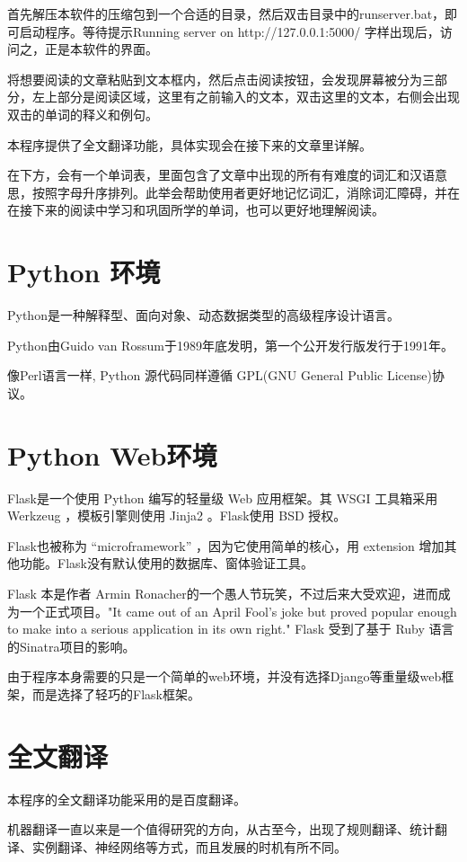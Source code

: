 \documentclass[a4paper, 11pt， oneside]{article}
\begin{document}
    首先解压本软件的压缩包到一个合适的目录，然后双击目录中的runserver.bat，即可启动程序。等待提示Running server on http://127.0.0.1:5000/ 字样出现后，访问之，正是本软件的界面。

    将想要阅读的文章粘贴到文本框内，然后点击阅读按钮，会发现屏幕被分为三部分，左上部分是阅读区域，这里有之前输入的文本，双击这里的文本，右侧会出现双击的单词的释义和例句。

    本程序提供了全文翻译功能，具体实现会在接下来的文章里详解。

    在下方，会有一个单词表，里面包含了文章中出现的所有有难度的词汇和汉语意思，按照字母升序排列。此举会帮助使用者更好地记忆词汇，消除词汇障碍，并在在接下来的阅读中学习和巩固所学的单词，也可以更好地理解阅读。
    
\section{Python 环境}
    Python是一种解释型、面向对象、动态数据类型的高级程序设计语言。

    Python由Guido van Rossum于1989年底发明，第一个公开发行版发行于1991年。
    
    像Perl语言一样, Python 源代码同样遵循 GPL(GNU General Public License)协议。
    
\section{Python Web环境}
    Flask是一个使用 Python 编写的轻量级 Web 应用框架。其 WSGI 工具箱采用 Werkzeug ，模板引擎则使用 Jinja2 。Flask使用 BSD 授权。
    
    Flask也被称为 “microframework” ，因为它使用简单的核心，用 extension 增加其他功能。Flask没有默认使用的数据库、窗体验证工具。

    Flask 本是作者 Armin Ronacher的一个愚人节玩笑，不过后来大受欢迎，进而成为一个正式项目。"It came out of an April Fool's joke but proved popular enough to make into a serious application in its own right." Flask 受到了基于 Ruby 语言的Sinatra项目的影响。

    由于程序本身需要的只是一个简单的web环境，并没有选择Django等重量级web框架，而是选择了轻巧的Flask框架。
\section{全文翻译}
    本程序的全文翻译功能采用的是百度翻译。

    机器翻译一直以来是一个值得研究的方向，从古至今，出现了规则翻译、统计翻译、实例翻译、神经网络等方式，而且发展的时机有所不同。
\end{document}
